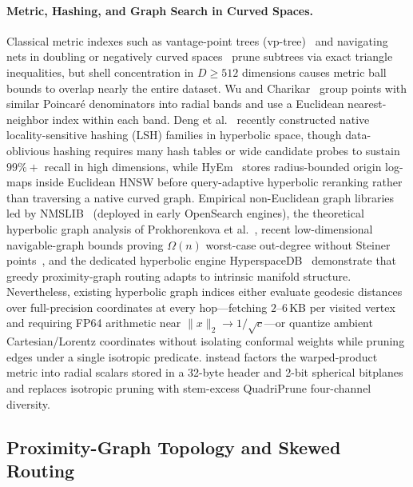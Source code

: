 \paragraph{Metric, Hashing, and Graph Search in Curved Spaces.}
Classical metric indexes such as vantage-point trees ({vp-tree})~\cite{yianilos1993data} and navigating nets in doubling or negatively curved spaces~\cite{krauthgamer2006navigating} prune subtrees via exact triangle inequalities, but shell concentration in $D \ge 512$ dimensions causes metric ball bounds to overlap nearly the entire dataset.
Wu and Charikar~\cite{wu2020hyperbolicnn} group points with similar Poincar\'e denominators into radial bands and use a Euclidean nearest-neighbor index within each band. Deng et al.~\cite{deng2026hyperboliclsh} recently constructed native locality-sensitive hashing ({LSH}) families in hyperbolic space, though data-oblivious hashing requires many hash tables or wide candidate probes to sustain $99\%+$ recall in high dimensions, while {HyEm}~\cite{deng2026hyem} stores radius-bounded origin log-maps inside Euclidean {HNSW} before query-adaptive hyperbolic reranking rather than traversing a native curved graph.
Empirical non-Euclidean graph libraries led by {NMSLIB}~\cite{boytsov2013engineering} (deployed in early OpenSearch engines), the theoretical hyperbolic graph analysis of Prokhorenkova et al.~\cite{prokhorenkova2022hyperbolic}, recent low-dimensional navigable-graph bounds proving $\Omega(n)$ worst-case out-degree without Steiner points~\cite{deng2026navigable}, and the dedicated hyperbolic engine {HyperspaceDB}~\cite{glukhota2026hyperspacedb} demonstrate that greedy proximity-graph routing adapts to intrinsic manifold structure.
Nevertheless, existing hyperbolic graph indices either evaluate geodesic distances over full-precision coordinates at every hop---fetching $2\text{--}6$\,KB per visited vertex and requiring FP64 arithmetic near $\|x\|_2 \to 1/\sqrt{c}$---or quantize ambient Cartesian/{Lorentz} coordinates without isolating conformal weights while pruning edges under a single isotropic predicate.
\rquiver{} instead factors the warped-product metric into radial scalars stored in a 32-byte header and 2-bit spherical bitplanes and replaces isotropic pruning with stem-excess {QuadriPrune} four-channel diversity.

\subsection{Proximity-Graph Topology and Skewed Routing}
\label{subsec:rel_graphs}

